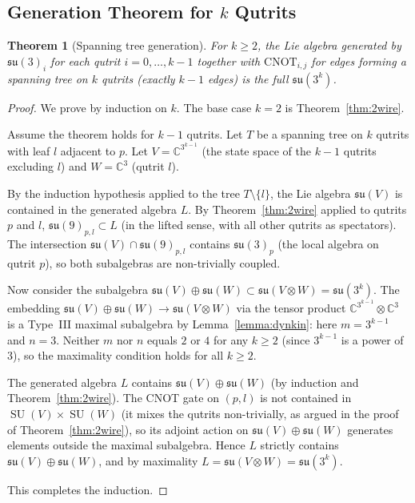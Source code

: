 \documentclass[12pt,a4paper]{article}
\newtheorem{theorem}{Theorem}
\newcommand{\SU}{\operatorname{SU}}
\begin{document}
\subsection{Generation Theorem for $k$ Qutrits}

\begin{theorem}[Spanning tree generation]
\label{thm:ktree}
For $k \ge 2$, the Lie algebra generated by $\mathfrak{su}(3)_i$ for
each qutrit $i = 0,\dots,k-1$ together with $\text{CNOT}_{i,j}$ for edges
forming a spanning tree on $k$ qutrits (exactly $k-1$ edges) is the full
$\mathfrak{su}(3^k)$.
\end{theorem}

\begin{proof}
We prove by induction on $k$. The base case $k=2$ is
Theorem~\ref{thm:2wire}.

Assume the theorem holds for $k-1$ qutrits. Let $T$ be a spanning tree on
$k$ qutrits with leaf $l$ adjacent to $p$. Let $V = \mathbb{C}^{3^{k-1}}$
(the state space of the $k-1$ qutrits excluding $l$) and
$W = \mathbb{C}^3$ (qutrit $l$).

By the induction hypothesis applied to the tree $T\setminus\{l\}$,
the Lie algebra $\mathfrak{su}(V)$ is contained in the generated
algebra $L$. By Theorem~\ref{thm:2wire} applied to qutrits $p$ and $l$,
$\mathfrak{su}(9)_{p,l} \subset L$ (in the lifted sense, with all other
qutrits as spectators). The intersection
$\mathfrak{su}(V) \cap \mathfrak{su}(9)_{p,l}$ contains
$\mathfrak{su}(3)_p$ (the local algebra on qutrit $p$), so both
subalgebras are non-trivially coupled.

Now consider the subalgebra $\mathfrak{su}(V) \oplus \mathfrak{su}(W)
\subset \mathfrak{su}(V\otimes W) = \mathfrak{su}(3^k)$. The embedding
$\mathfrak{su}(V)\oplus\mathfrak{su}(W) \to \mathfrak{su}(V\otimes W)$
via the tensor product $\mathbb{C}^{3^{k-1}}\otimes\mathbb{C}^3$ is a
Type~III maximal subalgebra by Lemma~\ref{lemma:dynkin}: here $m = 3^{k-1}$
and $n = 3$. Neither $m$ nor $n$ equals $2$ or $4$ for any $k \ge 2$
(since $3^{k-1}$ is a power of $3$), so the maximality condition holds
for all $k\ge 2$.

The generated algebra $L$ contains $\mathfrak{su}(V)\oplus\mathfrak{su}(W)$
(by induction and Theorem~\ref{thm:2wire}). The CNOT gate on $(p,l)$
is not contained in $\SU(V)\times\SU(W)$ (it mixes the qutrits non-trivially,
as argued in the proof of Theorem~\ref{thm:2wire}), so its adjoint action
on $\mathfrak{su}(V)\oplus\mathfrak{su}(W)$ generates elements outside
the maximal subalgebra. Hence $L$ strictly contains
$\mathfrak{su}(V)\oplus\mathfrak{su}(W)$, and by maximality
$L = \mathfrak{su}(V\otimes W) = \mathfrak{su}(3^k)$.

This completes the induction.
\end{proof}
\end{document}
